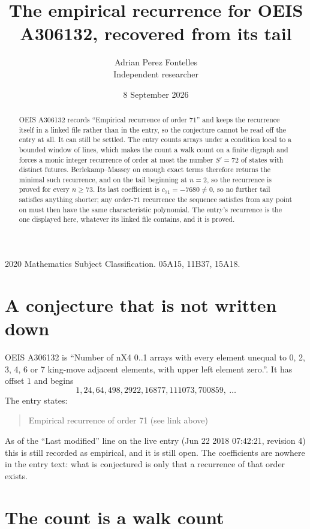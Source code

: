 \documentclass[11pt,a4paper]{article}
\title{The empirical recurrence for OEIS A306132, recovered from its tail}
\author{Adrian Perez Fontelles\\ \small Independent researcher}
\date{8 September 2026}
\theoremstyle{plain}
\theoremstyle{definition}
\begin{document}
\maketitle

\begin{abstract}
OEIS A306132 records ``Empirical recurrence of order $71$'' and keeps the recurrence itself in
a linked file rather than in the entry, so the conjecture cannot be read off the entry at all.
It can still be settled. The entry counts arrays under a condition local to a bounded window of
lines, which makes the count a walk count on a finite digraph and forces a monic integer
recurrence of order at most the number $S'=72$ of states with distinct futures. Berlekamp--Massey on
enough exact terms therefore returns the minimal such recurrence, and on the tail beginning at $n=2$, so the recurrence is proved for every $n\ge73$.
Its last coefficient is $c_{71}=-7680\neq0$, so no further tail satisfies anything
shorter; any order-$71$ recurrence the sequence satisfies from any point on must then have
the same characteristic polynomial. The entry's recurrence is the one displayed here, whatever
its linked file contains, and it is proved.
\end{abstract}

\noindent\small 2020 Mathematics Subject Classification. 05A15, 11B37, 15A18.\normalsize

\section{A conjecture that is not written down}

OEIS A306132 is ``Number of nX4 0..1 arrays with every element unequal to 0, 2, 3, 4, 6 or 7 king-move adjacent elements, with upper left element zero.''. It has offset $1$ and begins
\[
1, 24, 64, 498, 2922, 16877, 111073, 700859,\ \dots
\]
The entry states:
\begin{quote}
Empirical recurrence of order 71 (see link above)
\end{quote}
As of the ``Last modified'' line on the live entry (Jun 22 2018 07:42:21, revision 4)
this is still recorded as empirical, and it is still open. The coefficients are nowhere in the
entry text: what is conjectured is only that a recurrence of that order exists.

\section{The count is a walk count}
\end{document}
